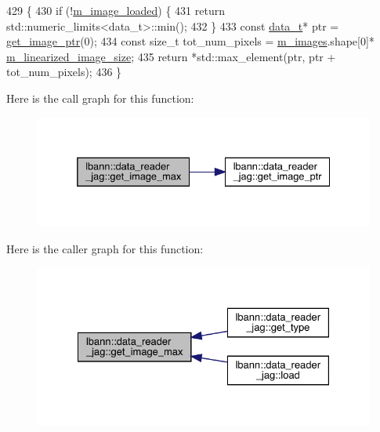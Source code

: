 \begin{DoxyCode}
429                                                            \{
430   \textcolor{keywordflow}{if} (!\hyperlink{classlbann_1_1data__reader__jag_a3f1691818996f73dc918dfd0e8f98a70}{m\_image\_loaded}) \{
431     \textcolor{keywordflow}{return} std::numeric\_limits<data\_t>::min();
432   \}
433   \textcolor{keyword}{const} \hyperlink{classlbann_1_1data__reader__jag_a7377d6c02c455f019a378489b9b8eab4}{data\_t}* ptr = \hyperlink{classlbann_1_1data__reader__jag_aab51581a1b8175bf5da1b74454ef7701}{get\_image\_ptr}(0);
434   \textcolor{keyword}{const} \textcolor{keywordtype}{size\_t} tot\_num\_pixels = \hyperlink{classlbann_1_1data__reader__jag_ae96696fb14653ef1b57936943eb6a800}{m\_images}.shape[0]*
      \hyperlink{classlbann_1_1data__reader__jag_a7c2aa5f489e7c7a3236c1f6c4a760048}{m\_linearized\_image\_size};
435   \textcolor{keywordflow}{return} *std::max\_element(ptr, ptr + tot\_num\_pixels);
436 \}
\end{DoxyCode}
Here is the call graph for this function\+:\nopagebreak
\begin{figure}[H]
\begin{center}
\leavevmode
\includegraphics[width=332pt]{classlbann_1_1data__reader__jag_abf4e3248e1f319202d0bb370316f0d8a_cgraph}
\end{center}
\end{figure}
Here is the caller graph for this function\+:\nopagebreak
\begin{figure}[H]
\begin{center}
\leavevmode
\includegraphics[width=328pt]{classlbann_1_1data__reader__jag_abf4e3248e1f319202d0bb370316f0d8a_icgraph}
\end{center}
\end{figure}
\mbox{\label{classlbann_1_1data__reader__jag_a7fd3f8e1b26f624bc91fac8fe4cff85e}} 
